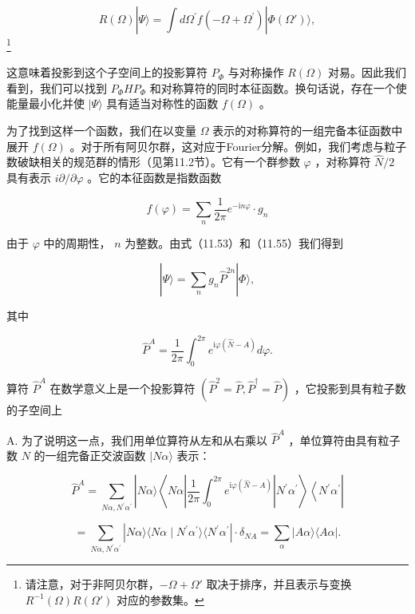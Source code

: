 \[
R\left(\Omega\right)|\Psi\rangle=\int d{\Omega}^{\prime}f\left({-\Omega+{\Omega}^{\prime}}\right)|\Phi(\Omega')\rangle,\tag{11.54}
\]
\footnote{请注意，对于非阿贝尔群，$-\Omega+\Omega'$ 取决于排序，并且表示与变换 $R^{-1}(\Omega)R(\Omega')$
对应的参数集。}

这意味着投影到这个子空间上的投影算符 ${P}_{\Phi}$ 与对称操作 $R\left(\Omega\right)$ 对易。因此我们看到，我们可以找到
${P}_{\Phi}H{P}_{\Phi}$ 和对称算符的同时本征函数。换句话说，存在一个使能量最小化并使 $|\Psi\rangle$
具有适当对称性的函数 $f\left(\Omega\right)$ 。

为了找到这样一个函数，我们在以变量 $\Omega$ 表示的对称算符的一组完备本征函数中展开 $f\left(\Omega\right)$
。对于所有阿贝尔群，这对应于Fourier分解。例如，我们考虑与粒子数破缺相关的规范群的情形（见第11.2节）。它有一个群参数 $\varphi$
，对称算符 $\widehat{N}/2$ 具有表示 $i\partial/\partial\varphi$ 。它的本征函数是指数函数

\[
f\left(\varphi\right)=\mathop{\sum}\limits_{n}\frac{1}{2\pi}{e}^{-{\mathrm{i}n\varphi}}\cdot{g}_{n}\tag{11.55}
\]

由于 $\varphi$ 中的周期性， $n$ 为整数。由式（11.53）和（11.55）我们得到

\[
|\Psi\rangle=\mathop{\sum}\limits_{n}{g}_{n}{\widehat{P}}^{2n}|\Phi\rangle,\tag{11.56}
\]

其中

\[
{\widehat{P}}^{A}=\frac{1}{2\pi}{\int}^{2\pi}_{0}{e}^{{\mathrm{i}\varphi}\left({\widehat{N}-A}\right)}{d\varphi}.\tag{11.57}
\]

算符 ${\widehat{P}}^{A}$ 在数学意义上是一个投影算符 $\left({{\widehat{P}}^{2}=\widehat{P},\widehat{P}^{\dagger}=\widehat{P}}\right)$
，它投影到具有粒子数的子空间上

A. 为了说明这一点，我们用单位算符从左和从右乘以 ${\widehat{P}}^{A}$ ，单位算符由具有粒子数 $N$ 的一组完备正交波函数
$|{N\alpha}\rangle$ 表示：

\[
{\widehat{P}}^{A}=\mathop{\sum}\limits_{{{N\alpha},{N}^{\prime}{\alpha}^{\prime}}}\left|{{N\alpha}\rangle\left\langle {{N\alpha}\left|{\frac{1}{2\pi}{\int}^{2\pi}_{0}{e}^{{\mathrm{i}\varphi}\left({\widehat{N}-A}\right)}}\right|{N}^{\prime}{\alpha}^{\prime}}\right\rangle \left\langle {{N}^{\prime}{\alpha}^{\prime}}\right.}\right|
\]

\[
=\mathop{\sum}\limits_{N\alpha,N^{\prime}\alpha^{\prime}}|N\alpha\rangle\langle N\alpha\mid N^{\prime}\alpha^{\prime}\rangle\langle N^{\prime}\alpha^{\prime}|\cdot\delta_{NA}=\mathop{\sum}\limits_{\alpha}|A\alpha\rangle\langle A\alpha|.\tag{11.58}
\]

